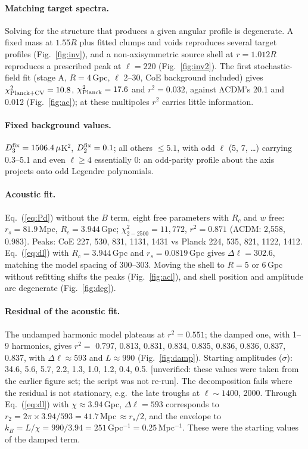 \documentclass[10pt,twocolumn]{article}
\newcommand{\flag}[1]{\textsf{[unverified: #1]}}
\begin{document}
\paragraph{Matching target spectra.} Solving for the structure that produces a given angular profile is degenerate. A fixed mass at $1.55R$ plus fitted clumps and voids reproduces several target profiles (Fig.~\ref{fig:inv}), and a non-axisymmetric source shell at $r=1.012R$ reproduces a prescribed peak at $\ell=220$ (Fig.~\ref{fig:inv2}). The first stochastic-field fit (stage A, $R=4$\,Gpc, $\ell$ 2--30, CoE background included) gives $\chi^2_{\rm Planck+CV}=10.8$, $\chi^2_{\rm Planck}=17.6$ and $r^2=0.032$, against ΛCDM's 20.1 and 0.012 (Fig.~\ref{fig:ac}); at these multipoles $r^2$ carries little information.

\paragraph{Fixed background values.} $D^{\rm fix}_3=1506.4\,\mu$K$^2$, $D^{\rm fix}_2=0.1$; all others $\le5.1$, with odd $\ell$ (5, 7, \ldots) carrying 0.3--5.1 and even $\ell\ge4$ essentially 0: an odd-parity profile about the axis projects onto odd Legendre polynomials.

\paragraph{Acoustic fit.} Eq.~(\ref{eq:Pd}) without the $B$ term, eight free parameters with $R_c$ and $w$ free: $r_s=81.9$\,Mpc, $R_c=3.944$\,Gpc; $\chi^2_{2-2500}=11{,}772$, $r^2=0.871$ (ΛCDM: 2{,}558, 0.983). Peaks: CoE 227, 530, 831, 1131, 1431 vs Planck 224, 535, 821, 1122, 1412. Eq.~(\ref{eq:dl}) with $R_c=3.944$\,Gpc and $r_s=0.0819$\,Gpc gives $\Delta\ell=302.6$, matching the model spacing of 300--303. Moving the shell to $R=5$ or 6\,Gpc without refitting shifts the peaks (Fig.~\ref{fig:acl}), and shell position and amplitude are degenerate (Fig.~\ref{fig:deg}).

\paragraph{Residual of the acoustic fit.} The undamped harmonic model plateaus at $r^2=0.551$; the damped one, with 1--9 harmonics, gives $r^2=$ 0.797, 0.813, 0.831, 0.834, 0.835, 0.836, 0.836, 0.837, 0.837, with $\Delta\ell\approx593$ and $L\approx990$ (Fig.~\ref{fig:damp}). Starting amplitudes ($\sigma$): 34.6, 5.6, 5.7, 2.2, 1.3, 1.0, 1.2, 0.4, 0.5. \flag{these values were taken from the earlier figure set; the script was not re-run}. The decomposition fails where the residual is not stationary, e.g.\ the late troughs at $\ell\sim1400$, 2000. Through Eq.~(\ref{eq:dl}) with $\chi\approx3.94$\,Gpc, $\Delta\ell=593$ corresponds to $r_2=2\pi\times3.94/593=41.7$\,Mpc$\,\approx r_s/2$, and the envelope to $k_B=L/\chi=990/3.94=251$\,Gpc$^{-1}=0.25$\,Mpc$^{-1}$. These were the starting values of the damped term.
\end{document}
